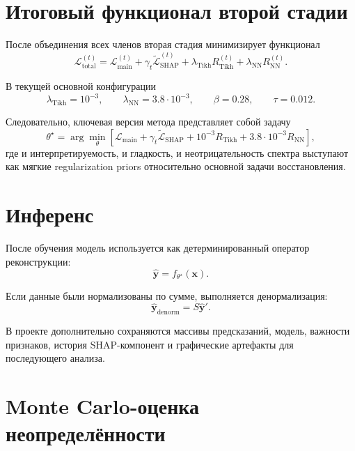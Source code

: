 \documentclass[11pt]{article}
\begin{document}
\section{Итоговый функционал второй стадии}

После объединения всех членов вторая стадия минимизирует функционал
\begin{equation}
\mathcal{L}_{\mathrm{total}}^{(t)} =
\mathcal{L}_{\mathrm{main}}^{(t)}
+ \gamma_t \widetilde{\mathcal{L}}_{\mathrm{SHAP}}^{(t)}
+ \lambda_{\mathrm{Tikh}} R_{\mathrm{Tikh}}^{(t)}
+ \lambda_{\mathrm{NN}} R_{\mathrm{NN}}^{(t)}.
\end{equation}

В текущей основной конфигурации
\begin{equation}
\lambda_{\mathrm{Tikh}} = 10^{-3},
\qquad
\lambda_{\mathrm{NN}} = 3.8\cdot 10^{-3},
\qquad
\beta = 0.28,
\qquad
\tau = 0.012.
\end{equation}

Следовательно, ключевая версия метода представляет собой задачу
\begin{equation}
\theta^{\star} = \arg\min_{\theta}
\left[
\mathcal{L}_{\mathrm{main}}
+ \gamma_t \widetilde{\mathcal{L}}_{\mathrm{SHAP}}
+ 10^{-3} R_{\mathrm{Tikh}}
+ 3.8\cdot 10^{-3} R_{\mathrm{NN}}
\right],
\end{equation}
где и интерпретируемость, и гладкость, и неотрицательность спектра выступают как мягкие regularization priors относительно основной задачи восстановления.

\section{Инференс}

После обучения модель используется как детерминированный оператор реконструкции:
\begin{equation}
\hat{\mathbf{y}} = f_{\theta^{\star}}(\mathbf{x}).
\end{equation}

Если данные были нормализованы по сумме, выполняется денормализация:
\begin{equation}
\hat{\mathbf{y}}_{\mathrm{denorm}} = S \hat{\mathbf{y}}'.
\end{equation}

В проекте дополнительно сохраняются массивы предсказаний, модель, важности признаков, история SHAP-компонент и графические артефакты для последующего анализа.

\section{Monte Carlo-оценка неопределённости}
\end{document}
